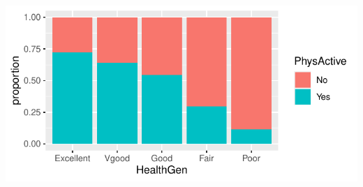 \documentclass[11pt]{article}\usepackage[]{graphicx}\usepackage[]{color}
\makeatletter
\def\maxwidth{ %
  \ifdim\Gin@nat@width>\linewidth
    \linewidth
  \else
    \Gin@nat@width
  \fi
}
\newenvironment{knitrout}{}{} %
\makeatother
\begin{document}
\begin{knitrout}
\color{fgcolor}
\includegraphics[width=\maxwidth]{figure/unnamed-chunk-5-1} 

\end{knitrout}
\end{document}
